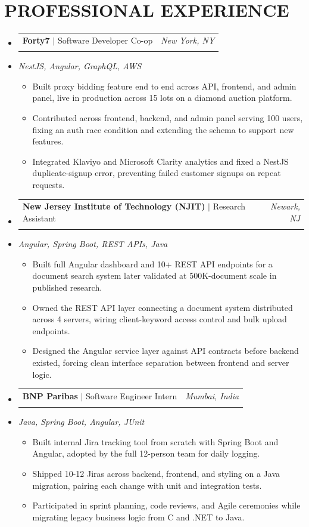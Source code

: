 \documentclass[letterpaper,11pt]{article}
\makeatletter
\newcommand{\resumeItem}[1]{
  \item\small{#1\vspace{-3pt}}
}
\newcommand{\resumeStack}[1]{
  \vspace{1pt}\item\small{\textit{#1}}\vspace{-6pt}
}
\newcommand{\resumeExpHeading}[4]{
  \vspace{-3pt}\item
    \begin{tabular*}{1.0\textwidth}[t]{l@{\extracolsep{\fill}}r}
      \textbf{\large #1} $|$ #2 & \textit{\large #3} \\
       & \text{\small #4} \\
    \end{tabular*}\vspace{-9pt}
}
\newcommand{\resumeItemListStart}{\begin{itemize}[leftmargin=0.15in, label=$\bullet$]}
\newcommand{\resumeItemListEnd}{\end{itemize}\vspace{-7pt}}
\newcommand{\resumeSubHeadingListStart}{\begin{itemize}[leftmargin=0.0in, label={}]}
\newcommand{\resumeSubHeadingListEnd}{\end{itemize}}
\makeatother
\begin{document}
\section{PROFESSIONAL EXPERIENCE}
\resumeSubHeadingListStart
\vspace{10pt}
\resumeExpHeading
{Forty7}{Software Developer Co-op}{New York, NY}{Jan 2026 -- May 2026}
\vspace{-13pt}
\resumeStack{NestJS, Angular, GraphQL, AWS}
\resumeItemListStart
  \resumeItem{Built proxy bidding feature end to end across API, frontend, and admin panel, live in production across 15 lots on a diamond auction platform.}
  \resumeItem{Contributed across frontend, backend, and admin panel serving 100 users, fixing an auth race condition and extending the schema to support new features.}
  \resumeItem{Integrated Klaviyo and Microsoft Clarity analytics and fixed a NestJS duplicate-signup error, preventing failed customer signups on repeat requests.}
\resumeItemListEnd
\vspace{10pt}
\resumeExpHeading
{New Jersey Institute of Technology (NJIT)}{Research Assistant}{Newark, NJ}{Apr 2025 -- Sep 2025}
\vspace{-13pt}
\resumeStack{Angular, Spring Boot, REST APIs, Java}
\resumeItemListStart
  \resumeItem{Built full Angular dashboard and 10+ REST API endpoints for a document search system later validated at 500K-document scale in published research.}
  \resumeItem{Owned the REST API layer connecting a document system distributed across 4 servers, wiring client-keyword access control and bulk upload endpoints.}
  \resumeItem{Designed the Angular service layer against API contracts before backend existed, forcing clean interface separation between frontend and server logic.}
\resumeItemListEnd
\vspace{10pt}
\resumeExpHeading
{BNP Paribas}{Software Engineer Intern}{Mumbai, India}{Jan 2024 -- Jul 2024}
\vspace{-13pt}
\resumeStack{Java, Spring Boot, Angular, JUnit}
\resumeItemListStart
  \resumeItem{Built internal Jira tracking tool from scratch with Spring Boot and Angular, adopted by the full 12-person team for daily logging.}
  \resumeItem{Shipped 10-12 Jiras across backend, frontend, and styling on a Java migration, pairing each change with unit and integration tests.}
  \resumeItem{Participated in sprint planning, code reviews, and Agile ceremonies while migrating legacy business logic from C and .NET to Java.}
\resumeItemListEnd

\resumeSubHeadingListEnd
\end{document}
